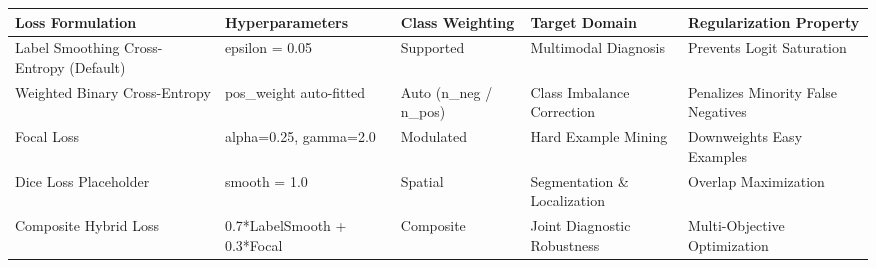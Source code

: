 \begin{tabular}{lllll}
\toprule
Loss Formulation & Hyperparameters & Class Weighting & Target Domain & Regularization Property \\
\midrule
Label Smoothing Cross-Entropy (Default) & epsilon = 0.05 & Supported & Multimodal Diagnosis & Prevents Logit Saturation \\
Weighted Binary Cross-Entropy & pos\_weight auto-fitted & Auto (n\_neg / n\_pos) & Class Imbalance Correction & Penalizes Minority False Negatives \\
Focal Loss & alpha=0.25, gamma=2.0 & Modulated & Hard Example Mining & Downweights Easy Examples \\
Dice Loss Placeholder & smooth = 1.0 & Spatial & Segmentation \& Localization & Overlap Maximization \\
Composite Hybrid Loss & 0.7*LabelSmooth + 0.3*Focal & Composite & Joint Diagnostic Robustness & Multi-Objective Optimization \\
\bottomrule
\end{tabular}
